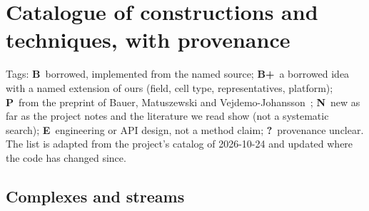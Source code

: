\section{Catalogue of constructions and techniques, with provenance}\label{app:catalogue}

Tags: \textbf{B}~borrowed, implemented from the named source; \textbf{B+}~a borrowed idea with a named extension of ours (field, cell type,
representatives, platform); \textbf{P}~from the preprint of Bauer, Matuszewski and Vejdemo-Johansson~\cite{bauer2024generating};
\textbf{N}~new as far as the project notes and the literature we read show (not a systematic search); \textbf{E}~engineering or API
design, not a method claim; \textbf{?}~provenance unclear. The list is adapted from the project's catalog of 2026-10-24
and updated where the code has changed since. 

\subsection{Complexes and streams}

